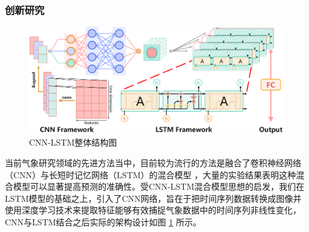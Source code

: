 \subsubsection{创新研究}

\begin{figure}[h]
  \centering
  \includegraphics[width=1.0\textwidth]{./Img/CNN_LSTM结构图.pdf}
  \caption{CNN-LSTM整体结构图}\label{fig:4-11}
\end{figure}

当前气象研究领域的先进方法当中，目前较为流行的方法是融合了卷积神经网络（CNN）与长短时记忆网络（LSTM）的混合模型 \cite{HJKZ2024011600J}\cite{JYGC20240415002}，大量的实验结果表明这种混合模型可以显著提高预测的准确性。受CNN-LSTM混合模型思想的启发，我们在LSTM模型的基础之上，引入了CNN网络，旨在于把时间序列数据转换成图像并使用深度学习技术来提取特征能够有效捕捉气象数据中的时间序列非线性变化，CNN与LSTM结合之后实际的架构设计如图 \ref{fig:4-11} 所示。





